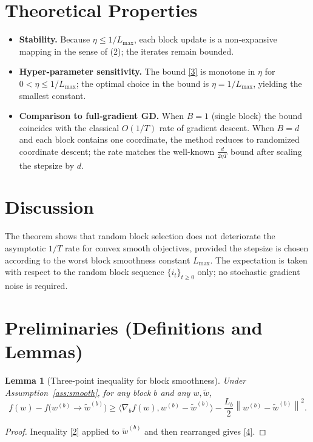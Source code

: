 \documentclass{article}
\newtheorem{lemma}{Lemma}
\newcommand{\norm}[1]{\left\lVert #1\right\rVert}
\begin{document}
\section*{Theoretical Properties}
\begin{itemize}[leftmargin=*]
\item \textbf{Stability.} Because $\eta\le 1/L_{\max}$, each block update is a
non‑expansive mapping in the sense of (2); the iterates remain bounded.
\item \textbf{Hyper‑parameter sensitivity.} The bound \eqref{3} is monotone in
$\eta$ for $0<\eta\le 1/L_{\max}$; the optimal choice in the bound is
$\eta=1/L_{\max}$, yielding the smallest constant.
\item \textbf{Comparison to full‑gradient GD.} When $B=1$ (single block) the bound
coincides with the classical $O(1/T)$ rate of gradient descent.
When $B=d$ and each block contains one coordinate, the method reduces to
randomized coordinate descent; the rate matches the well‑known
$\frac{d}{2\eta T}$ bound after scaling the stepsize by $d$.
\end{itemize}

\section*{Discussion}
The theorem shows that random block selection does not deteriorate the
asymptotic $1/T$ rate for convex smooth objectives, provided the stepsize is
chosen according to the worst block smoothness constant $L_{\max}$.  The
expectation is taken with respect to the random block sequence
$\{i_{t}\}_{t\ge0}$ only; no stochastic gradient noise is required.

\newpage

\section*{Preliminaries (Definitions and Lemmas)}
\begin{lemma}[Three‑point inequality for block smoothness]\label{lem:3pt}
Under Assumption~\ref{ass:smooth}, for any block $b$ and any $w,\tilde w$,
\[
f(w)-f\bigl(w^{(b)}\!\!\to\!\tilde w^{(b)}\bigr)
\ge
\langle \nabla_{b}f(w),w^{(b)}-\tilde w^{(b)}\rangle
-\frac{L_{b}}{2}\norm{w^{(b)}-\tilde w^{(b)}}^{2}.
\tag{4}
\]
\end{lemma}
\begin{proof}
Inequality \eqref{2} applied to $\tilde w^{(b)}$ and then rearranged
gives \eqref{4}. \hfill\qedsymbol
\end{proof}
\end{document}
